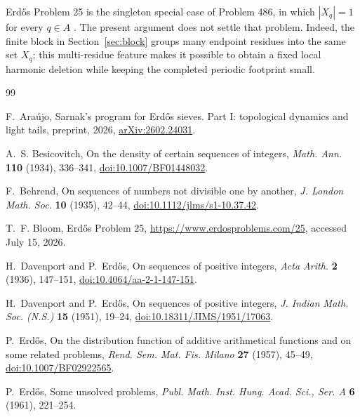 \documentclass[11pt]{article}
\numberwithin{equation}{section}
\theoremstyle{definition}
\theoremstyle{remark}
\begin{document}
Erd\H{o}s Problem 25 is the singleton special case of Problem 486, in
which \(|X_q|=1\) for every \(q\in A\) \cite{Bloom25}.  The present
argument does not settle that problem.  Indeed, the finite block in
Section~\ref{sec:block} groups many endpoint residues into the same set
\(X_q\); this multi-residue feature makes it possible to obtain a fixed
local harmonic deletion while keeping the completed periodic footprint
small.

\begin{thebibliography}{99}

F.~Ara\'ujo,
\newblock Sarnak's program for Erd\H{o}s sieves. Part I:
topological dynamics and light tails,
\newblock preprint, 2026,
\newblock \href{https://arxiv.org/abs/2602.24031}
{arXiv:2602.24031}.

A.~S. Besicovitch,
\newblock On the density of certain sequences of integers,
\newblock \emph{Math. Ann.} \textbf{110} (1934), 336--341,
\newblock \href{https://doi.org/10.1007/BF01448032}
{doi:10.1007/BF01448032}.

F.~Behrend,
\newblock On sequences of numbers not divisible one by another,
\newblock \emph{J. London Math. Soc.} \textbf{10} (1935), 42--44,
\newblock \href{https://doi.org/10.1112/jlms/s1-10.37.42}
{doi:10.1112/jlms/s1-10.37.42}.

T.~F. Bloom,
\newblock Erd\H{o}s Problem 25,
\newblock \url{https://www.erdosproblems.com/25},
accessed July 15, 2026.

H.~Davenport and P.~Erd\H{o}s,
\newblock On sequences of positive integers,
\newblock \emph{Acta Arith.} \textbf{2} (1936), 147--151,
\newblock \href{https://doi.org/10.4064/aa-2-1-147-151}
{doi:10.4064/aa-2-1-147-151}.

H.~Davenport and P.~Erd\H{o}s,
\newblock On sequences of positive integers,
\newblock \emph{J. Indian Math. Soc. (N.S.)} \textbf{15} (1951), 19--24,
\newblock \href{https://doi.org/10.18311/JIMS/1951/17063}
{doi:10.18311/JIMS/1951/17063}.

P.~Erd\H{o}s,
\newblock On the distribution function of additive arithmetical functions
and on some related problems,
\newblock \emph{Rend. Sem. Mat. Fis. Milano} \textbf{27} (1957), 45--49,
\newblock \href{https://doi.org/10.1007/BF02922565}
{doi:10.1007/BF02922565}.

P.~Erd\H{o}s,
\newblock Some unsolved problems,
\newblock \emph{Publ. Math. Inst. Hung. Acad. Sci., Ser. A}
\textbf{6} (1961), 221--254.


\end{thebibliography}
\end{document}
